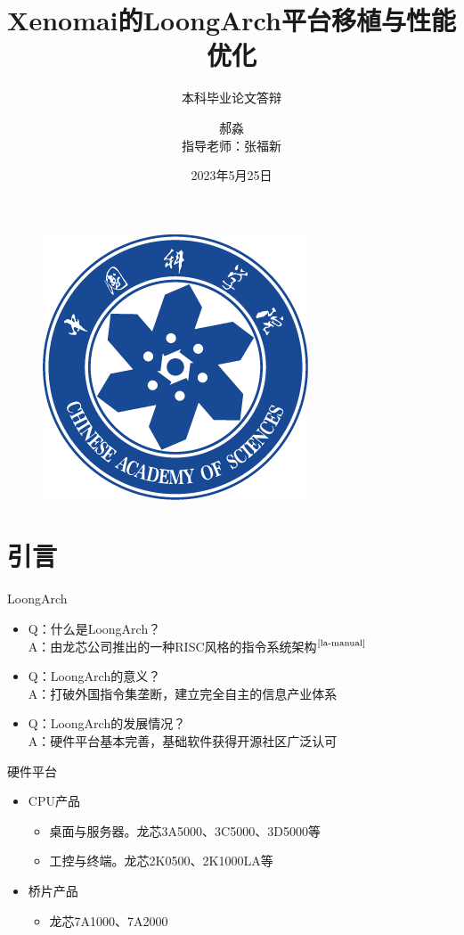 \documentclass{beamer}
\author[郝淼]{郝淼\\{指导老师：张福新}}
\title{Xenomai的LoongArch平台移植与性能优化}
\subtitle{本科毕业论文答辩}
\institute{中国科学院大学计算机科学与技术学院}
\date{2023年5月25日}
\begin{document}
\heiti
\begin{frame}
    \titlepage
    \begin{figure}[htpb]
        \begin{center}
            \includegraphics[width=0.2\linewidth]{pic/CAS_Logo.png}
        \end{center}
    \end{figure}
\end{frame}

\begin{frame}
    \tableofcontents[sectionstyle=show,subsectionstyle=show/shaded/hide,subsubsectionstyle=show/shaded/hide]
\end{frame}


\section{引言}

\begin{frame}{LoongArch}

    \begin{itemize}[<+-| alert@+>] %
        \item Q：什么是LoongArch？\\
        A：由龙芯公司推出的一种RISC风格的指令系统架构$^{\text{\cite{la-manual}}}$
        \item Q：LoongArch的意义？\\
        A：打破外国指令集垄断，建立完全自主的信息产业体系
        \item Q：LoongArch的发展情况？ \\
        A：硬件平台基本完善，基础软件获得开源社区广泛认可
    \end{itemize}
    
\end{frame}

\begin{frame}{硬件平台}
    \begin{itemize}
        \item CPU产品
        \begin{itemize}
            \item {\kaishu 桌面与服务器。}龙芯3A5000、3C5000、3D5000等
            \item {\kaishu 工控与终端。}龙芯2K0500、2K1000LA等
        \end{itemize}
        \item 桥片产品
        \begin{itemize}
            \item 龙芯7A1000、7A2000
        \end{itemize}
    \end{itemize}
\end{frame}
\end{document}
